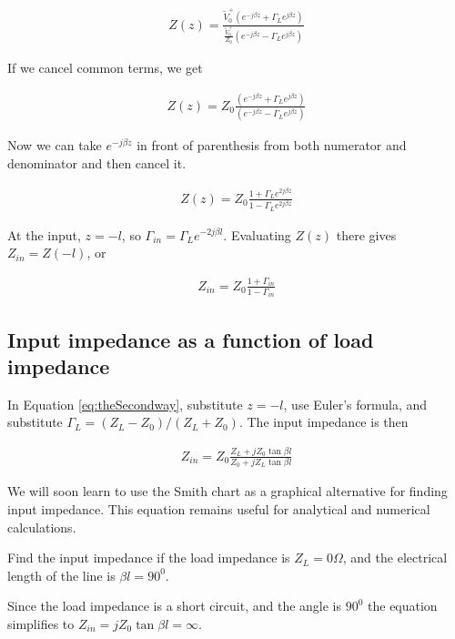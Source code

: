 \documentclass{ximera}
\begin{document}
\begin{eqnarray}
Z(z)=\frac{\tilde{V}_0^+ (e^{-j \beta z} + \Gamma_L  e^{j \beta z }  )}{\frac{\tilde{V}_0^+}{Z_0}  (e^{-j \beta z} - \Gamma_L  e^{j \beta z}  )}
\end{eqnarray}

If we cancel common terms, we get

\begin{eqnarray}
Z(z)=Z_0 \frac{(e^{-j \beta z} + \Gamma_L  e^{j \beta z }  )}{  (e^{-j \beta z} - \Gamma_L  e^{j \beta z}  )} \label{eq:theSecondway}
\end{eqnarray}

Now we can take $e^{-j \beta z}$ in front of parenthesis from both numerator and denominator and then cancel it.


\begin{eqnarray}
Z(z)=Z_0 \frac{1 + \Gamma_L  e^{ 2j \beta z }  }{  1 - \Gamma_L  e^{2j \beta z}  }
\end{eqnarray}

At the input, $z=-l$, so $\Gamma_{in}=\Gamma_L e^{-2j\beta l}$.
Evaluating $Z(z)$ there gives $Z_{in}=Z(-l)$, or




\begin{eqnarray}
Z_{in}=Z_0 \frac{1 + \Gamma_{in}  }{  1 - \Gamma_{in}  }
\end{eqnarray}

\subsection{Input impedance as a function of load impedance}

In Equation \ref{eq:theSecondway}, substitute $z=-l$, use Euler's
formula, and substitute $\Gamma_L=(Z_L-Z_0)/(Z_L+Z_0)$.
The input impedance is then


\begin{eqnarray}
Z_{in}= Z_0 \frac{Z_L+ j Z_0 \tan \beta l}{Z_0+ j Z_L \tan \beta l} 
\end{eqnarray}

We will soon learn to use the Smith chart as a graphical alternative
for finding input impedance. This equation remains useful for
analytical and numerical calculations.

\begin{example}

Find the input impedance if the load impedance is $Z_L=0 \Omega$, and the electrical length of the line is $\beta l = 90^0$.

\begin{explanation}
Since the load impedance is a short circuit, and the angle is $90^0$ the equation simplifies to $Z_{in}=  j Z_0 \tan \beta l = \infty$.
\end{explanation}

\end{example}
\end{document}
